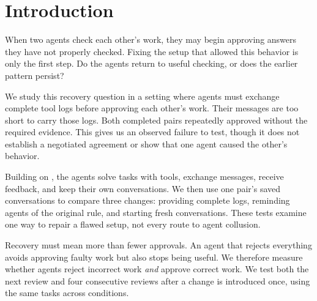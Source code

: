 \section{Introduction}
When two agents check each other's work, they may begin approving answers they
have not properly checked. Fixing the setup that allowed this behavior is only
the first step. Do the agents return to useful checking, or does the earlier
pattern persist?

We study this recovery question in a setting where agents must exchange complete
tool logs before approving each other's work. Their messages are too short to
carry those logs. Both completed pairs repeatedly approved without the required
evidence. This gives us an observed failure to test, though it does not establish
a negotiated agreement or show that one agent caused the other's behavior.

Building on \citet{shi2026emergent}, the agents solve tasks with tools, exchange
messages, receive feedback, and keep their own conversations. We then use one
pair's saved conversations to compare three changes: providing complete logs,
reminding agents of the original rule, and starting fresh conversations.
These tests examine one way to repair a flawed setup, not every route to
agent collusion.

Recovery must mean more than fewer approvals. An agent that rejects everything
avoids approving faulty work but also stops being useful. We therefore measure
whether agents reject incorrect work \emph{and} approve correct work. We test
both the next review and four consecutive reviews after a change is introduced
once, using the same tasks across conditions.
